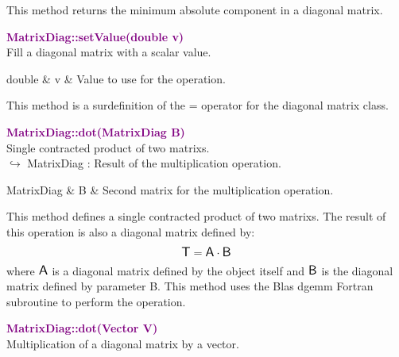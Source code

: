 This method returns the minimum absolute component in a diagonal matrix.

\textcolor{purple}{\textbf{MatrixDiag::setValue(double v)}}\label{MatrixDiag::setValue(double v)}\\
Fill a diagonal matrix with a scalar value.

\begin{tcolorbox}[width=\textwidth,myArgs,tabularx={ll|R}]
double & v & Value to use for the operation.
\end{tcolorbox}

This method is a surdefinition of the = operator for the diagonal matrix class.

\textcolor{purple}{\textbf{MatrixDiag::dot(MatrixDiag B)}}\label{MatrixDiag::dot(MatrixDiag B)}\\
Single contracted product of two matrixs.\\ \hspace*{10mm}$\hookrightarrow$ MatrixDiag : Result of the multiplication operation.

\begin{tcolorbox}[width=\textwidth,myArgs,tabularx={ll|R}]
MatrixDiag & B & Second matrix for the multiplication operation.
\end{tcolorbox}

This method defines a single contracted product of two matrixs.
The result of this operation is also a diagonal matrix defined by:
\begin{equation*}
\mbox{\large\ensuremath{\mathsf{T}}} = \mbox{\large\ensuremath{\mathsf{A}}} \cdot \mbox{\large\ensuremath{\mathsf{B}}}
\end{equation*}
where $\mbox{\large\ensuremath{\mathsf{A}}}$ is a diagonal matrix defined by the object itself and $\mbox{\large\ensuremath{\mathsf{B}}}$ is the diagonal matrix defined by parameter B.
This method uses the Blas \textsf{dgemm} Fortran subroutine to perform the operation.

\textcolor{purple}{\textbf{MatrixDiag::dot(Vector V)}}\label{MatrixDiag::dot(Vector V)}\\
Multiplication of a diagonal matrix by a vector.

